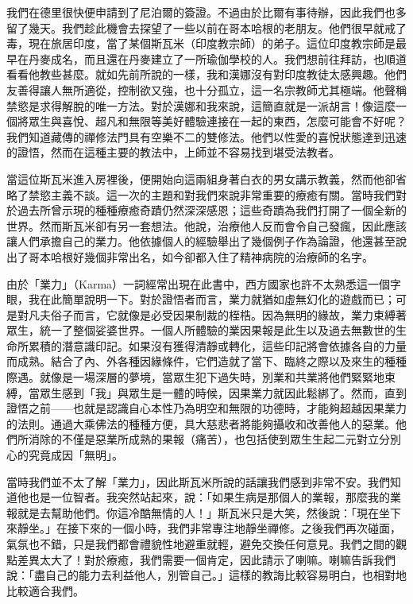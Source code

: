 我們在德里很快便申請到了尼泊爾的簽證。不過由於比爾有事待辦，因此我們也多留了幾天。我們趁此機會去探望了一些以前在哥本哈根的老朋友。他們很早就戒了毒，現在旅居印度，當了某個斯瓦米（印度教宗師）的弟子。這位印度教宗師是最早在丹麥成名，而且還在丹麥建立了一所瑜伽學校的人。我們想前往拜訪，也順道看看他教些甚麼。就如先前所說的一樣，我和漢娜沒有對印度教徒太感興趣。他們友善得讓人無所適從，控制欲又強，也十分孤立，這一名宗教師尤其極端。他聲稱禁慾是求得解脫的唯一方法。對於漢娜和我來說，這簡直就是一派胡言！像這麼一個將眾生與喜悅、超凡和無限等美好體驗連接在一起的東西，怎麼可能會不好呢？我們知道藏傳的禪修法門具有空樂不二的雙修法。他們以性愛的喜悅狀態達到迅速的證悟，然而在這種主要的教法中，上師並不容易找到堪受法教者。

當這位斯瓦米進入房裡後，便開始向這兩組身著白衣的男女講示教義，然而他卻省略了禁慾主義不談。這一次的主題和對我們來說非常重要的療癒有關。當時我們對於過去所曾示現的種種療癒奇蹟仍然深深感恩；這些奇蹟為我們打開了一個全新的世界。然而斯瓦米卻有另一套想法。他說，治療他人反而會令自己發瘋，因此應該讓人們承擔自己的業力。他依據個人的經驗舉出了幾個例子作為論證，他還甚至說出了哥本哈根好幾個非常出名，如今卻都入住了精神病院的治療師的名字。

由於「業力」（Karma）一詞經常出現在此書中，西方國家也許不太熟悉這一個字眼，我在此簡單說明一下。對於證悟者而言，業力就猶如虛無幻化的遊戲而已；可是對凡夫俗子而言，它就像是必受因果制裁的桎梏。因為無明的緣故，業力束縛著眾生，統一了整個娑婆世界。一個人所體驗的業因果報是此生以及過去無數世的生命所累積的潛意識印記。如果沒有獲得清靜或轉化，這些印記將會依據各自的力量而成熟。結合了內、外各種因緣條件，它們造就了當下、臨終之際以及來生的種種際遇。就像是一場深層的夢境，當眾生犯下過失時，別業和共業將他們緊緊地束縛，當眾生感到「我」與眾生是一體的時候，因果業力就因此鬆綁了。然而，直到證悟之前——也就是認識自心本性乃為明空和無限的功德時，才能夠超越因果業力的法則。通過大乘佛法的種種方便，具大慈悲者將能夠攝收和改善他人的惡業。他們所消除的不僅是惡業所成熟的果報（痛苦），也包括使到眾生生起二元對立分別心的究竟成因「無明」。

當時我們並不太了解「業力」，因此斯瓦米所說的話讓我們感到非常不安。我們知道他也是一位智者。我突然站起來，說：「如果生病是那個人的業報，那麼我的業報就是去幫助他們。你這冷酷無情的人！」斯瓦米只是大笑，然後說：「現在坐下來靜坐。」在接下來的一個小時，我們非常專注地靜坐禪修。之後我們再次碰面，氣氛也不錯，只是我們都會禮貌性地避重就輕，避免交換任何意見。我們之間的觀點差異太大了！對於療癒，我們需要一個肯定，因此請示了喇嘛。喇嘛告訴我們說：「盡自己的能力去利益他人，別管自己。」這樣的教誨比較容易明白，也相對地比較適合我們。

